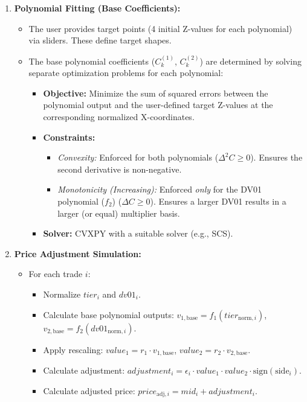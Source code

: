 \documentclass[11pt, a4paper]{article}
\begin{document}
\begin{enumerate}
    \item \textbf{Polynomial Fitting (Base Coefficients):}
        \begin{itemize}[nosep]
            \item The user provides target points (4 initial Z-values for each polynomial) via sliders. These define target shapes.
            \item The base polynomial coefficients ($C^{(1)}_k$, $C^{(2)}_k$) are determined by solving separate optimization problems for each polynomial:
                \begin{itemize}
                    \item \textbf{Objective:} Minimize the sum of squared errors between the polynomial output and the user-defined target Z-values at the corresponding normalized X-coordinates.
                    \item \textbf{Constraints:}
                        \begin{itemize}
                            \item \textit{Convexity:} Enforced for both polynomials ($\Delta^2 C \ge 0$). Ensures the second derivative is non-negative.
                            \item \textit{Monotonicity (Increasing):} Enforced \textit{only} for the DV01 polynomial ($f_2$) ($\Delta C \ge 0$). Ensures a larger DV01 results in a larger (or equal) multiplier basis.
                        \end{itemize}
                    \item \textbf{Solver:} CVXPY with a suitable solver (e.g., SCS).
                \end{itemize}
        \end{itemize}

    \item \textbf{Price Adjustment Simulation:}
        \begin{itemize}[nosep]
            \item For each trade $i$:
                \begin{itemize}
                    \item Normalize $tier_i$ and $dv01_i$.
                    \item Calculate base polynomial outputs: $v_{1,\text{base}} = f_1(tier_{\text{norm},i})$, $v_{2,\text{base}} = f_2(dv01_{\text{norm},i})$.
                    \item Apply rescaling: $value_1 = r_1 \cdot v_{1,\text{base}}$, $value_2 = r_2 \cdot v_{2,\text{base}}$.
                    \item Calculate adjustment: $adjustment_i = \epsilon_i \cdot value_1 \cdot value_2 \cdot \text{sign}(\text{side}_i)$.
                    \item Calculate adjusted price: $price_{\text{adj},i} = mid_i + adjustment_i$.
                \end{itemize}
        \end{itemize}


\end{enumerate}
\end{document}
